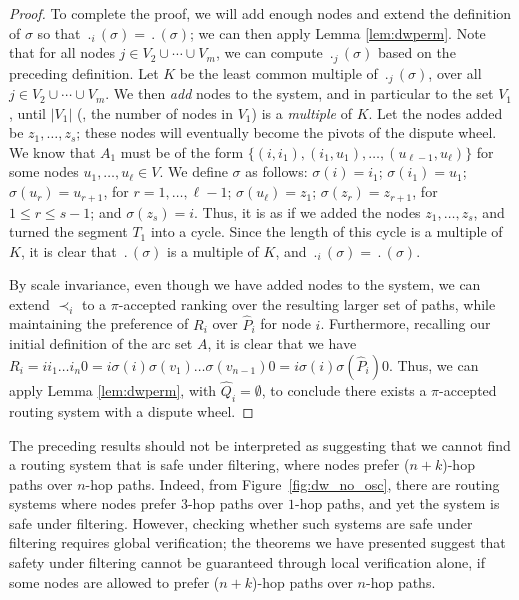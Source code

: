 \begin{proof}
To complete the proof, we will add enough nodes and extend the
definition of $\sigma$ so that $\period_i(\sigma) = \period(\sigma)$;
we can then apply Lemma \ref{lem:dwperm}.  Note that for all nodes $j \in V_2
\cup \cdots \cup V_m$, we can compute $\period_j(\sigma)$ based on the
preceding definition.  Let $K$ be the least common multiple of
$\period_j(\sigma)$, over all $j \in V_2 \cup \cdots \cup V_m$.  We
then {\em add} nodes to the system, and in particular to the set
$V_1$, until $|V_1|$ (\ie, the number of nodes in $V_1$) is a
{\em multiple} of $K$.  Let the nodes added be $z_1, \ldots, z_s$;
these nodes will eventually become the pivots of the dispute wheel.  We
know that $A_1$ must be of the form $\{ (i,i_1), (i_1, u_1),\ldots, (u_{\ell-1},
u_\ell)\}$ for some nodes $u_1, \ldots, u_\ell \in V$.  We define
$\sigma$ as follows: $\sigma(i) = i_1$; $\sigma(i_1) = u_1$;
$\sigma(u_r) = u_{r+1}$, for $r = 1,\ldots,\ell-1$; $\sigma(u_\ell) =
z_1$; $\sigma(z_r) = z_{r+1}$, for $1 \leq r \leq s-1$; and
$\sigma(z_s) = i$.  Thus, it is as if we added the nodes $z_1, \ldots,
z_s$, and turned the segment $T_1$ into a cycle.  Since the length of
this cycle is a multiple of $K$, it is clear that $\period(\sigma)$ is
a multiple of $K$, and $\period_i(\sigma) = \period(\sigma)$.  

By scale invariance, even though we have added nodes to the system, we
can extend $\prec_i$ to a $\pi$-accepted ranking over the
resulting larger set of paths, while maintaining the preference of
$R_i$ over $\hat{P}_i$ for node $i$.  Furthermore, recalling our initial
definition 
of the arc set $A$, it is clear that we have $R_i = i i_1 \ldots i_n 0
= i \sigma(i) \sigma(v_1) \ldots \sigma(v_{n-1}) 0 = i \sigma(i)
\sigma(\hat{P}_i) 0$.  Thus, we can apply Lemma \ref{lem:dwperm}, with
$\hat{Q}_i = \emptyset$, to
conclude there exists a $\pi$-accepted routing system with a dispute
wheel.
\end{proof}

The preceding results should not be interpreted as suggesting that we
cannot find a routing system that is safe under filtering, where
nodes prefer ($n+k$)-hop paths over $n$-hop paths.  Indeed, 
from Figure~\ref{fig:dw_no_osc}, there are routing systems where nodes prefer
$3$-hop paths over $1$-hop paths, and yet the system is safe under
filtering.  However, checking whether such systems are safe under
filtering requires global verification; the theorems we have presented
suggest that safety under filtering cannot be guaranteed through local
verification alone, if some nodes are allowed to prefer ($n+k$)-hop
paths over $n$-hop paths.

